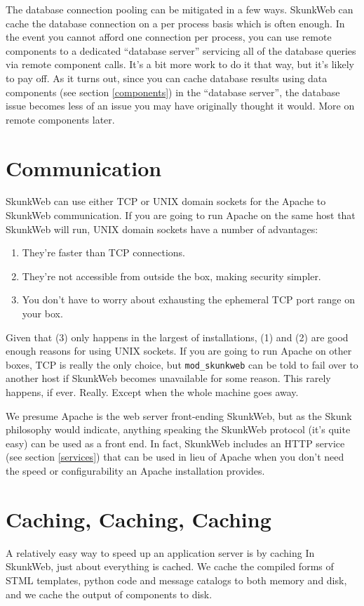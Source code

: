 \documentclass[twocolumn]{article}
\begin{document}
The database connection pooling can be mitigated in a few ways.
SkunkWeb can cache the database connection on a per process basis
which is often enough.  In the event you cannot afford one connection
per process, you can use remote components to a dedicated ``database
server'' servicing all of the database queries via remote component
calls.  It's a bit more work to do it that way, but it's likely to pay
off.  As it turns out, since you can cache database results using data
components (see section \ref{components}) in the ``database server'',
the database issue becomes less of an issue you may have originally
thought it would.  More on remote components later.

\section{Communication}
SkunkWeb can use either TCP or UNIX domain sockets for the
Apache\cite{apache} to SkunkWeb communication.  If you are going to run
Apache on the same host that SkunkWeb will run, UNIX domain
sockets have a number of advantages:
\begin{enumerate}
\item They're faster than TCP connections.
\item They're not accessible from outside the box, making security
simpler.
\item You don't have to worry about exhausting the ephemeral TCP port
range on your box.
\end{enumerate}
Given that (3) only happens in the largest of installations, (1) and
(2) are good enough reasons for using UNIX sockets.  If you are going
to run Apache on other boxes, TCP is really the only choice, but
\texttt{mod\_skunkweb} can be told to fail over to another host if
SkunkWeb becomes unavailable for some reason.  This rarely happens, if
ever.  Really.  Except when the whole machine goes away.

We presume Apache is the web server front-ending SkunkWeb, but as the
Skunk philosophy would indicate, anything speaking the SkunkWeb
protocol (it's quite easy) can be used as a front end.  In fact,
SkunkWeb includes an HTTP service (see section \ref{services}) that
can be used in lieu of Apache when you don't need the speed or
configurability an Apache installation provides.
 
\section{Caching, Caching, Caching}
A relatively easy way to speed up an application server is by
caching  In SkunkWeb, just about everything is
cached.  We cache the compiled forms of STML templates, python code
and message catalogs to both memory and disk, and we cache the output
of components to disk.
\end{document}
